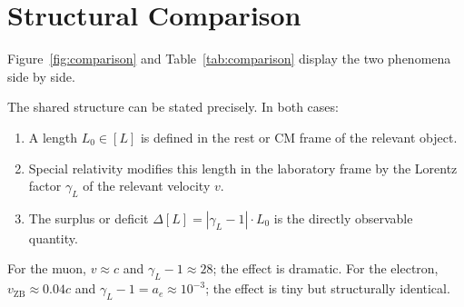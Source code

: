 \documentclass[%
 reprint, amsmath,amssymb, aps, prb, ]{revtex4-2}
\numberwithin{equation}{section}
\newcommand{\vZB}{v_{\text{ZB}}}
\newcommand{\gammaL}{\gamma_{L}}
\begin{document}
\section{\label{sec:comparison}Structural Comparison}

Figure~\ref{fig:comparison} and Table~\ref{tab:comparison} display the two phenomena side by side.

The shared structure can be stated precisely. In both cases:
\begin{enumerate}[leftmargin=*, label=(\roman*)]
\item A length $L_0 \in [L]$ is defined in the rest or CM frame of the relevant object.
\item Special relativity modifies this length in the laboratory frame by the Lorentz factor $\gammaL$ of the relevant velocity $v$.
\item The surplus or deficit $\Delta[L] = |\gammaL - 1|\cdot L_0$ is the directly observable quantity.
\end{enumerate}
For the muon, $v \approx c$ and $\gammaL - 1 \approx 28$; the effect is dramatic. For the electron, $\vZB \approx 0.04c$ and $\gammaL - 1 = a_e \approx 10^{-3}$; the effect is tiny but structurally identical.
\end{document}

